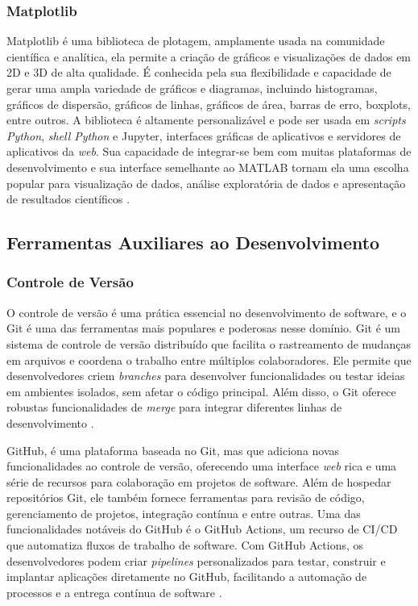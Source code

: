 \subsubsection{Matplotlib}

Matplotlib é uma biblioteca de plotagem, amplamente usada na comunidade científica e analítica, ela permite a criação de
gráficos e visualizações de dados em 2D e 3D de alta qualidade.
É conhecida pela sua flexibilidade e capacidade de gerar uma ampla variedade de gráficos e diagramas, incluindo
histogramas, gráficos de dispersão, gráficos de linhas, gráficos de área, barras de erro, boxplots, entre outros.
A biblioteca é altamente personalizável e pode ser usada em \textit{scripts Python}, \textit{shell Python} e Jupyter,
interfaces gráficas de aplicativos e servidores de aplicativos da \textit{web}.
Sua capacidade de integrar-se bem com muitas plataformas de desenvolvimento e sua interface semelhante ao MATLAB tornam
ela uma escolha popular para visualização de dados, análise exploratória de dados e apresentação de resultados
científicos \cite{matplotlib}.

\subsection{Ferramentas Auxiliares ao Desenvolvimento}

\subsubsection{Controle de Versão}


O controle de versão é uma prática essencial no desenvolvimento de software, e o Git é uma das ferramentas mais
populares e poderosas nesse domínio.
Git é um sistema de controle de versão distribuído que facilita o rastreamento de mudanças em arquivos e coordena o
trabalho entre múltiplos colaboradores.
Ele permite que desenvolvedores criem \textit{branches} para desenvolver funcionalidades ou testar ideias em ambientes
isolados, sem afetar o código principal.
Além disso, o Git oferece robustas funcionalidades de \textit{merge} para integrar diferentes linhas de desenvolvimento
\cite{git}.

GitHub, é uma plataforma baseada no Git, mas que adiciona novas funcionalidades ao controle de versão, oferecendo uma
interface \textit{web} rica e uma série de recursos para colaboração em projetos de software.
Além de hospedar repositórios Git, ele também fornece ferramentas para revisão de código, gerenciamento de projetos,
integração contínua e entre outras.
Uma das funcionalidades notáveis do GitHub é o GitHub Actions, um recurso de CI/CD que automatiza fluxos de trabalho
de software.
Com GitHub Actions, os desenvolvedores podem criar \textit{pipelines} personalizados para testar, construir e implantar
aplicações diretamente no GitHub, facilitando a automação de processos e a entrega contínua de software \cite{github}.


